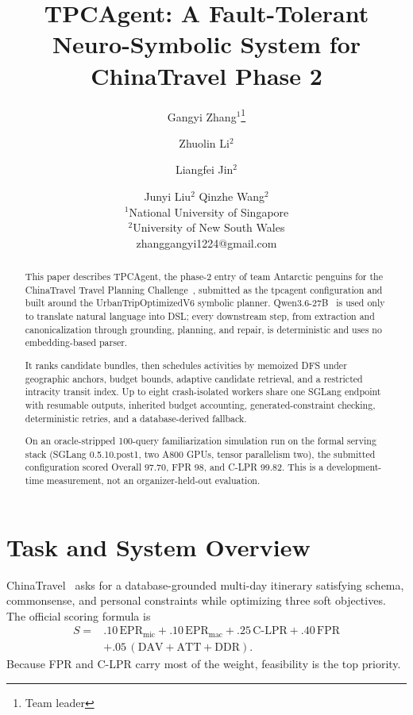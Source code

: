 \documentclass{article}
\title{TPCAgent: A Fault-Tolerant Neuro-Symbolic System for\\
ChinaTravel Phase 2}
\author{
Gangyi Zhang$^1$\thanks{Team leader}\and
Zhuolin Li$^{2}$\and
Liangfei Jin$^{2}$\and
Junyi Liu$^{2}$\And
Qinzhe Wang$^{2}$\\
\affiliations
$^{1}$National University of Singapore\\
$^{2}$University of New South Wales\\
\emails
zhanggangyi1224@gmail.com
}
\begin{document}
 
\maketitle
 
\begin{abstract}
This paper describes TPCAgent, the phase-2 entry of team Antarctic penguins for the ChinaTravel Travel Planning Challenge~\cite{tpc,chinatravel}, submitted as the tpcagent configuration and built around the UrbanTripOptimizedV6 symbolic planner. Qwen3.6-27B~\cite{qwen} is used only to translate natural language into DSL; every downstream step, from extraction and canonicalization through grounding, planning, and repair, is deterministic and uses no embedding-based parser.

It ranks candidate bundles, then schedules activities by memoized DFS under geographic anchors, budget bounds, adaptive candidate retrieval, and a restricted intracity transit index. Up to eight crash-isolated workers share one SGLang endpoint with resumable outputs, inherited budget accounting, generated-constraint checking, deterministic retries, and a database-derived fallback.

On an oracle-stripped 100-query familiarization simulation run on the formal serving stack (SGLang 0.5.10.post1, two A800 GPUs, tensor parallelism two), the submitted configuration scored Overall 97.70, FPR 98, and C-LPR 99.82. This is a development-time measurement, not an organizer-held-out evaluation.


\end{abstract}
 
\section{Task and System Overview}
\label{sec:scope}
 
ChinaTravel~\cite{chinatravel} asks for a database-grounded
multi-day itinerary satisfying schema, commonsense, and personal
constraints while optimizing three soft objectives. The official scoring formula is
\begin{equation*}
\begin{split}
S={}&.10\,\mathrm{EPR_{mic}}+.10\,\mathrm{EPR_{mac}}
   +.25\,\mathrm{C\text{-}LPR}+.40\,\mathrm{FPR}\\
  &+.05\,(\mathrm{DAV}+\mathrm{ATT}+\mathrm{DDR}).
\end{split}
\end{equation*}
Because FPR and C-LPR carry most of the weight, feasibility is the top
priority.
 
\end{document}
